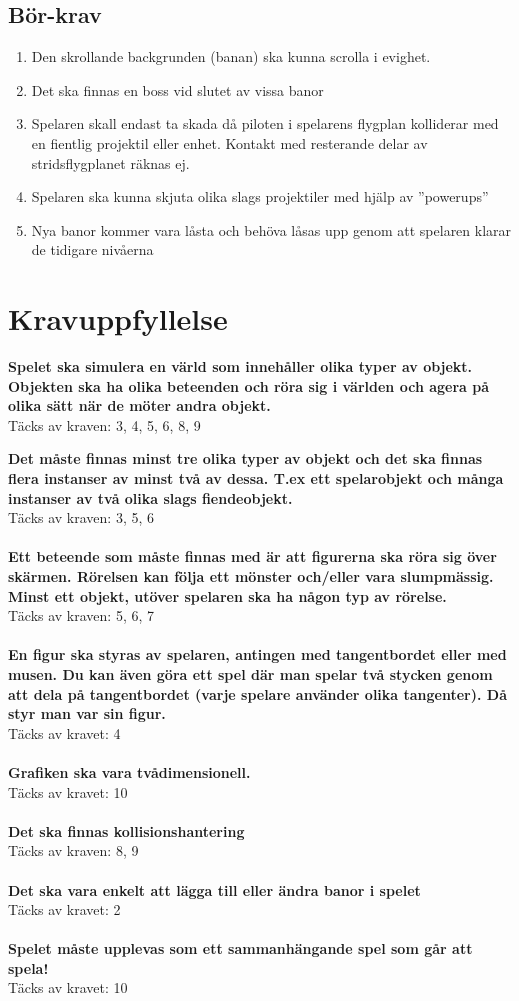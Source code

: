 \documentclass{TDP005mall}
\begin{document}
\subsection{Bör-krav}
\begin{enumerate}
  \item Den skrollande backgrunden (banan) ska kunna scrolla i evighet.
  \item Det ska finnas en boss vid slutet av vissa banor
  \item Spelaren skall endast ta skada då piloten i spelarens flygplan kolliderar med en fientlig projektil eller enhet. Kontakt med resterande delar av stridsflygplanet räknas ej. 
  \item Spelaren ska kunna skjuta olika slags projektiler med hjälp av ''powerups''
  \item Nya banor kommer vara låsta och behöva låsas upp genom att spelaren klarar de tidigare nivåerna 
\end{enumerate}
\section{Kravuppfyllelse}
\textbf{Spelet ska simulera en värld som innehåller olika typer av objekt. Objekten ska ha olika beteenden och röra sig i världen och agera på olika sätt när de möter andra objekt.}
\\
Täcks av kraven: 3, 4, 5, 6, 8, 9

\textbf{Det måste finnas minst tre olika typer av objekt och det ska finnas flera instanser av minst två av dessa. T.ex ett spelarobjekt och många instanser av två olika slags fiendeobjekt.}
\\
Täcks av kraven: 3, 5, 6
\\\\
\textbf{Ett beteende som måste finnas med är att figurerna ska röra sig över skärmen. Rörelsen kan följa ett mönster och/eller vara slumpmässig. Minst ett objekt, utöver spelaren ska ha någon typ av rörelse.}
\\
Täcks av kraven: 5, 6, 7 
\\\\
\textbf{En figur ska styras av spelaren, antingen med tangentbordet eller med musen. Du kan även göra ett spel där man spelar två stycken genom att dela på tangentbordet (varje spelare använder olika tangenter). Då styr man var sin figur.}
\\
Täcks av kravet: 4  
\\\\
\textbf{Grafiken ska vara tvådimensionell.}
\\
Täcks av kravet: 10
\\\\
\textbf{Det ska finnas kollisionshantering}
\\
Täcks av kraven: 8, 9 
\\\\
\textbf{Det ska vara enkelt att lägga till eller ändra banor i spelet}
\\
Täcks av kravet: 2
\\\\
\textbf{Spelet måste upplevas som ett sammanhängande spel som går att spela!}
\\
Täcks av kravet: 10
\end{document}
